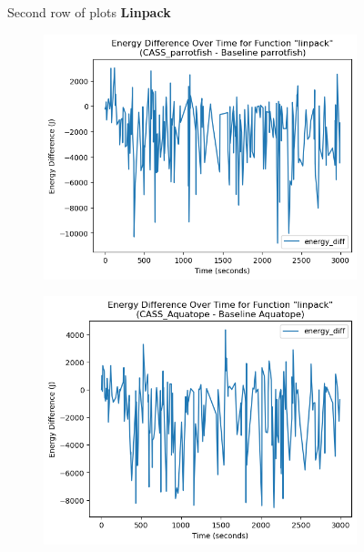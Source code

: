 \documentclass[times, 10pt,twocolumn]{article}
\begin{document}
\begin{figure}[ht]
   Second row of plots
   \textbf{Linpack}\par\medskip
   \begin{subfigure}[b]{0.4\textwidth}
      \includegraphics[width=\textwidth]{imgs/final_experiment_plots/energy_comparison/parrotfish/linpack.png}
     \caption{}
     \label{fig:linpack_energy_diff_parrotfish}
   \end{subfigure}
   \hfill
   \begin{subfigure}[b]{0.4\textwidth}
      \includegraphics[width=\textwidth]{imgs/final_experiment_plots/energy_comparison/aquatope/linpack.png}
     \caption{}
     \label{fig:linpack_energy_diff_aquatope}
   \end{subfigure}
   

\end{figure}
\end{document}
